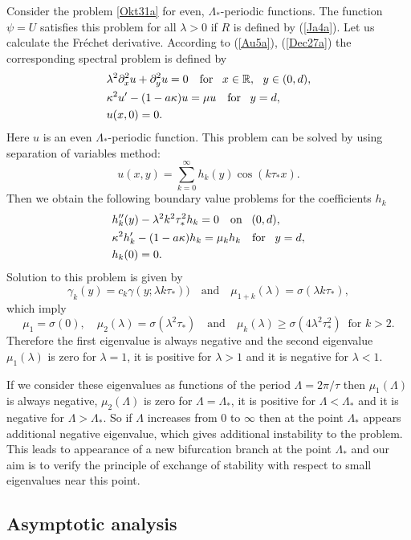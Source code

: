 \documentclass[oneside,a4paper,11pt]{article}
\theoremstyle{thmstyletwo}%
\theoremstyle{thmstylethree}%
\numberwithin{equation}{section}
\def\gamm{\gamma}
\def\taust{\tau_{*}}
\def\Disp{\sigma}
\def\dUd{\kappa}
\def\mddU{a}
\begin{document}
Consider the problem \eqref{Okt31a} for even, $\Lambda_*$-periodic functions.
The function $\psi=U$ satisfies this problem for all $\lambda>0$ if $R$ is defined by (\ref{Ja4a}). Let us calculate the Fr\'{e}chet derivative.  According to (\ref{Au5a}), (\ref{Dec27a}) the corresponding spectral problem is defined by
\begin{equation}
\label{Ja22a}
\begin{aligned}
&\lambda^2\partial_x^2u+\partial_y^2u=0\quad\mbox{for\!}\quad x\in\mathbb{R},\ \ y\in (0,d),\\
&\dUd^2 u'-(1-\mddU\dUd)u=\mu u\quad\mbox{for\!}\quad y=d,\\
&u(x,0)=0.
\end{aligned}
\end{equation}
Here $u$ is an even $\Lambda_*$-periodic function. This problem can be solved by using separation of variables method:
$$
u(x,y)=\sum_{k=0}^\infty h_k(y)\cos(k\taust x).
$$
Then we obtain the following boundary value problems for the coefficients $h_k$
\begin{align*}
&h_k''(y)-\lambda^2k^2\taust^2h_k=0\quad\mbox{on\!}\quad (0,d),\\
&\dUd^2 h_k'-(1-\mddU\dUd)h_k=\mu_k h_k\quad\mbox{for\!}\quad y=d,\\
& h_k(0)=0.
\end{align*}
Solution to this problem is given by
$$
\gamm_k(y)=c_k\gamm(y;\lambda k\taust))\quad\mbox{and}\quad\mu_{1+k}(\lambda)=\Disp(\lambda k\taust),
$$
which imply
$$
\mu_1=\Disp(0),\quad\mu_2(\lambda)=\Disp(\lambda^2\taust)\quad\mbox{and}\quad \mu_k(\lambda)\geq \Disp(4\lambda^2\taust^2)\;\;\mbox{for $k>2$}.
$$
Therefore the first eigenvalue is always negative and the second eigenvalue $\mu_1(\lambda)$ is zero for $\lambda=1$, it is positive for $\lambda>1$ and it is negative for $\lambda<1$.

If we consider these eigenvalues as functions of the period $\Lambda=2\pi/\tau$ then $\mu_1(\Lambda)$ is always negative, $\mu_2(\Lambda)$ is zero for $\Lambda=\Lambda_*$, it is positive for $\Lambda<\Lambda_*$ and it is negative for $\Lambda>\Lambda_*$. So if $\Lambda$ increases from $0$ to $\infty$ then at the point $\Lambda_*$ appears additional negative eigenvalue, which gives additional instability to the problem. This leads to appearance of a new bifurcation branch  at the point $\Lambda_*$ and our aim is to verify the principle of exchange of stability with respect to small eigenvalues near this point.

\subsection{Asymptotic analysis}\label{SJa22b}
\end{document}
